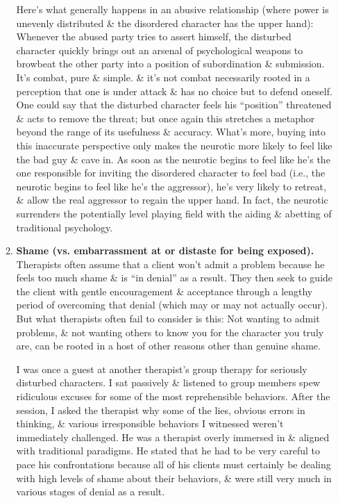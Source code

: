\documentclass{article}
\numberwithin{equation}{section}
\begin{document}
\begin{itemize}
\begin{enumerate}
		Here's what generally happens in an abusive relationship (where power is unevenly distributed \& the disordered character has the upper hand): Whenever the abused party tries to assert himself, the disturbed character quickly brings out an arsenal of psychological weapons to browbeat the other party into a position of subordination \& submission. It's combat, pure \& simple. \& it's not combat necessarily rooted in a perception that one is under attack \& has no choice but to defend oneself. One could say that the disturbed character feels his ``position'' threatened \& acts to remove the threat; but once again this stretches a metaphor beyond the range of its usefulness \& accuracy. What's more, buying into this inaccurate perspective only makes the neurotic more likely to feel like the bad guy \& cave in. As soon as the neurotic begins to feel like he's the one responsible for inviting the disordered character to feel bad (i.e., the neurotic begins to feel like he's the aggressor), he's very likely to retreat, \& allow the real aggressor to regain the upper hand. In fact, the neurotic surrenders the potentially level playing field with the aiding \& abetting of traditional psychology.
		\item \textbf{Shame (vs. embarrassment at or distaste for being exposed).} Therapists often assume that a client won't admit a problem because he feels too much shame \& is ``in denial'' as a result. They then seek to guide the client with gentle encouragement \& acceptance  through a lengthy period of overcoming that denial (which may or may not actually occur). But what therapists often fail to consider is this: Not wanting to admit problems, \& not wanting others to know you for the character you truly are, can be rooted in a host of other reasons other than genuine shame.
		
		I was once a guest at another therapist's group therapy for seriously disturbed characters. I sat passively \& listened to group members spew ridiculous excuses for some of the most reprehensible behaviors. After the session, I asked the therapist why some of the lies, obvious errors in thinking, \& various irresponsible behaviors I witnessed weren't immediately challenged. He was a therapist overly immersed in \& aligned with traditional paradigms. He stated that he had to be very careful to pace his confrontations because all of his clients must certainly be dealing with high levels of shame about their behaviors, \& were still very much in various stages of denial as a result.
		

\end{enumerate}
\end{itemize}
\end{document}
